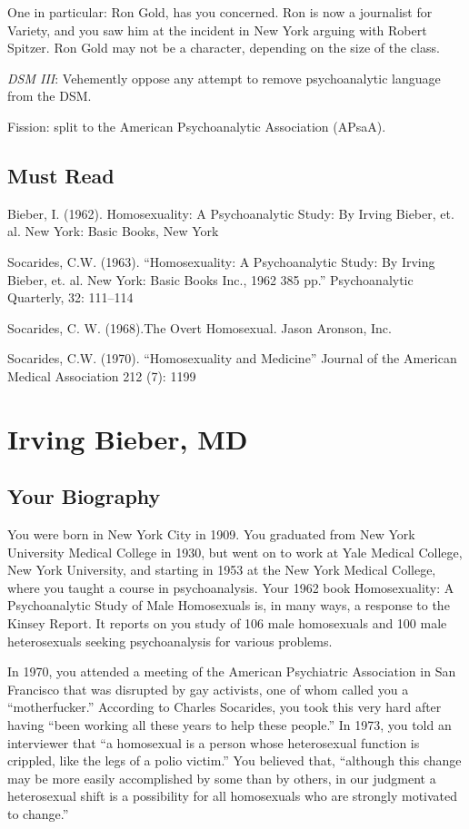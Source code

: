 \begin{refsection}
One in particular: Ron Gold, has you concerned. Ron is now a journalist for Variety, and you saw him at the incident in New York arguing with Robert Spitzer. Ron Gold may not be a character, depending on the size of the class.

\emph{DSM III}: Vehemently oppose any attempt to remove psychoanalytic language from the DSM.

Fission: split to the American Psychoanalytic Association (APsaA).

\section{Must Read}
\label{mustread}

Bieber, I. (1962). Homosexuality: A Psychoanalytic Study: By Irving Bieber, et. al. New York: Basic Books, New York

Socarides, C.W. (1963). ``Homosexuality: A Psychoanalytic Study: By Irving Bieber, et. al. New York: Basic Books Inc., 1962 385 pp.'' Psychoanalytic Quarterly, 32: 111--114

Socarides, C. W. (1968).The Overt Homosexual. Jason Aronson, Inc.

Socarides, C.W. (1970). ``Homosexuality and Medicine'' Journal of the American Medical Association 212 (7): 1199

\chapter{Irving Bieber, MD}
\label{irvingbiebermd}

\section{Your Biography}
\label{yourbiography}

You were born in New York City in 1909. You graduated from New York University Medical College in 1930, but went on to work at Yale Medical College, New York University, and starting in 1953 at the New York Medical College, where you taught a course in psychoanalysis. Your 1962 book Homosexuality: A Psychoanalytic Study of Male Homosexuals is, in many ways, a response to the Kinsey Report. It reports on you study of 106 male homosexuals and 100 male heterosexuals seeking psychoanalysis for various problems.

In 1970, you attended a meeting of the American Psychiatric Association in San Francisco that was disrupted by gay activists, one of whom called you a ``motherfucker.'' According to Charles Socarides, you took this very hard after having ``been working all these years to help these people.'' In 1973, you told an interviewer that ``a homosexual is a person whose heterosexual function is crippled, like the legs of a polio victim.'' You believed that, ``although this change may be more easily accomplished by some than by others, in our judgment a heterosexual shift is a possibility for all homosexuals who are strongly motivated to change.''


\end{refsection}
